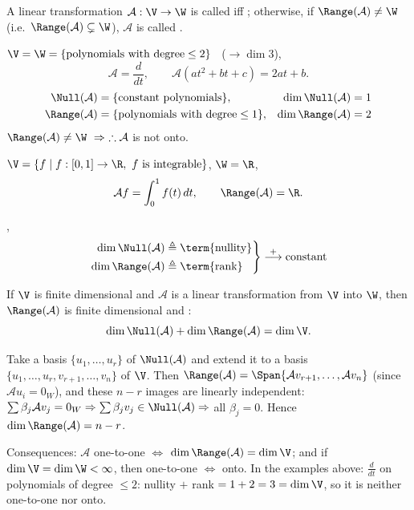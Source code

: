 \begin{definition}
A linear transformation $\mathcal{A}:\V\to\W$ is called  iff ; otherwise, if $\Range(\mathcal{A})\ne\W$ (i.e.\ $\Range(\mathcal{A})\subsetneq\W$), $\mathcal{A}$ is called .
\end{definition}

\begin{example}
$\V=\W=\{\text{polynomials with degree}\le 2\}$ \ ($\to\dim 3$),
\[
\mathcal{A}=\frac{d}{dt}, \qquad \mathcal{A}(at^2+bt+c)=2at+b.
\]
\begin{align*}
\Null(\mathcal{A})&=\{\text{constant polynomials}\}, & \dim\Null(\mathcal{A})&=1\\
\Range(\mathcal{A})&=\{\text{polynomials with degree}\le 1\}, & \dim\Range(\mathcal{A})&=2
\end{align*}
$\Range(\mathcal{A})\ne \W \ \Rightarrow\ \therefore \mathcal{A}$ is not onto.
\end{example}

\begin{example}
$\V=\{f\mid f:[0,1]\to\R,\ f \text{ is integrable}\}$, \quad $\W=\R$,
\[
\mathcal{A}f=\int_0^1 f(t)\,dt, \qquad \Range(\mathcal{A})=\R.
\]
\end{example}

\sep
\[
\left.\begin{aligned}
\dim\Null(\mathcal{A}) &\triangleq \text{\term{nullity}}\\
\dim\Range(\mathcal{A}) &\triangleq \text{\term{rank}}
\end{aligned}\right\}\overset{+}{\longrightarrow} \text{constant}
\]

\begin{theorem}
If $\V$ is finite dimensional and $\mathcal{A}$ is a linear transformation from $\V$ into $\W$, then $\Range(\mathcal{A})$ is finite dimensional and :
\[
\dim\Null(\mathcal{A})+\dim\Range(\mathcal{A})=\dim\V .
\]
\end{theorem}
\begin{insight}
Take a basis $\{u_1,\dots,u_r\}$ of $\Null(\mathcal{A})$ and extend it to a basis $\{u_1,\dots,u_r,v_{r+1},\dots,v_n\}$ of $\V$. Then $\Range(\mathcal{A})=\Span\{\mathcal{A}v_{r+1},\dots,\mathcal{A}v_n\}$ (since $\mathcal{A}u_i=0_W$), and these $n-r$ images are linearly independent: $\sum\beta_j\mathcal{A}v_j=0_W\Rightarrow\sum\beta_jv_j\in\Null(\mathcal{A})\Rightarrow$ all $\beta_j=0$. Hence $\dim\Range(\mathcal{A})=n-r$.

Consequences: $\mathcal{A}$ one-to-one $\iff$ $\dim\Range(\mathcal{A})=\dim\V$; and if $\dim\V=\dim\W<\infty$, then one-to-one $\iff$ onto. In the examples above: $\frac{d}{dt}$ on polynomials of degree $\le2$: nullity $+$ rank $=1+2=3=\dim\V$, so it is neither one-to-one nor onto.
\end{insight}

